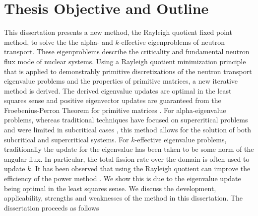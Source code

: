 \section{Thesis Objective and Outline}
This dissertation presents a new method, the Rayleigh quotient fixed point method, to solve the the alpha- and $k$-effective eigenproblems of neutron transport. These eigenproblems describe the criticality and fundamental neutron flux mode of nuclear systems. Using a Rayleigh quotient minimization principle that is applied to demonstrably primitive discretizations of the neutron transport eigenvalue problems and the properties of primitive matrices, a new iterative method is derived. The derived eigenvalue updates are optimal in the least squares sense and positive eigenvector updates are guaranteed from the Froebenius-Perron Theorem for primitive matrices \cite{birkhoff_reactor_1958}. For alpha-eigenvalue problems, whereas traditional techniques have focused on supercritical problems and were limited in subcritical cases \cite{hill_efficient_1983}, this method allows for the solution of both subcritical and supercritical systems. For $k$-effective eigenvalue problems, traditionally the update for the eigenvalue has been taken to be some norm of the angular flux. In particular, the total fission rate over the domain is often used to update $k$. It has been observed that using the Rayleigh quotient can improve the efficiency of the power method \cite{warsa2004krylov}. We show this is due to the eigenvalue update being optimal in the least squares sense. 
We discuss the development, applicability, strengths and weaknesses of the method in this dissertation. The dissertation proceeds as follows

